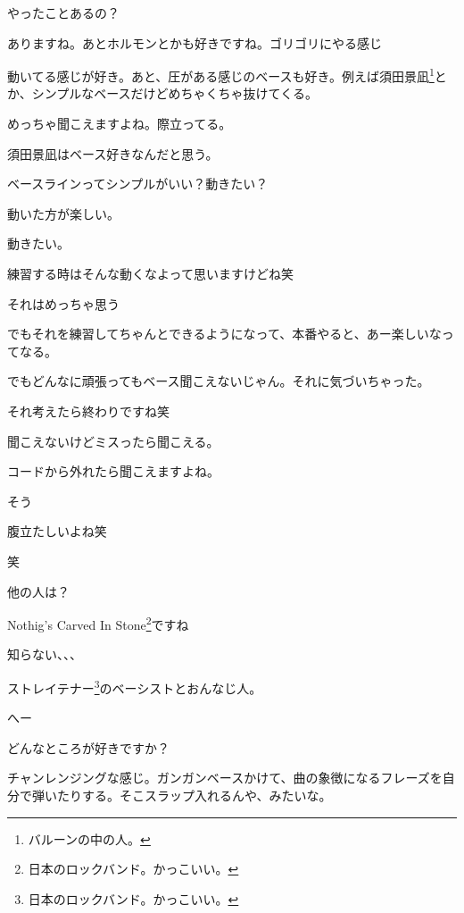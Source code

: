 \begin{multicols}{3}
やったことあるの？

ありますね。あとホルモンとかも好きですね。ゴリゴリにやる感じ

動いてる感じが好き。あと、圧がある感じのベースも好き。例えば須田景凪\footnote{バルーンの中の人。}とか、シンプルなベースだけどめちゃくちゃ抜けてくる。

めっちゃ聞こえますよね。際立ってる。

須田景凪はベース好きなんだと思う。

ベースラインってシンプルがいい？動きたい？

動いた方が楽しい。

動きたい。

練習する時はそんな動くなよって思いますけどね笑

それはめっちゃ思う

でもそれを練習してちゃんとできるようになって、本番やると、あー楽しいなってなる。

でもどんなに頑張ってもベース聞こえないじゃん。それに気づいちゃった。

それ考えたら終わりですね笑

聞こえないけどミスったら聞こえる。

コードから外れたら聞こえますよね。

そう

腹立たしいよね笑

笑

他の人は？

Nothig’s \! Carved \! In \! Stone\footnote{日本のロックバンド。かっこいい。}ですね

知らない、、、

ストレイテナー\footnote{日本のロックバンド。かっこいい。}のベーシストとおんなじ人。

へー

どんなところが好きですか？

チャンレンジングな感じ。ガンガンベースかけて、曲の象徴になるフレーズを自分で弾いたりする。そこスラップ入れるんや、みたいな。


\end{multicols}
